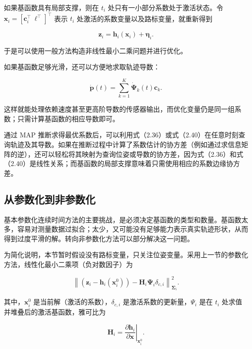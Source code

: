 如果基函数具有局部支撑，则在 $t_i$ 处只有一小部分系数处于激活状态。令 $\pmb x_i=[\pmb c_i^\top\ \pmb\ell^\top]^\top$ 表示 $t_i$ 处激活的系数变量以及路标变量，就重新得到

\begin{equation}
\boldsymbol {z} _ {i} = \boldsymbol {h} _ {i} (\boldsymbol {x} _ {i}) + \boldsymbol {\eta} _ {i}.\tag{2.39}
\end{equation}

于是可以使用一般方法构造非线性最小二乘问题并进行优化。

如果基函数足够光滑，还可以方便地求取轨迹导数：

\begin{equation}
\dot {\pmb {p}} (t) = \sum_ {k = 1} ^ {K} \dot {\pmb {\Psi}} _ {k} (t) \pmb {c} _ {k}.\tag{2.40}
\end{equation}

这样就能处理依赖速度甚至更高阶导数的传感器输出，而优化变量仍是同一组系数；只需计算基函数的相应导数即可。

通过 MAP 推断求得最优系数后，可以利用式（2.36）或式（2.40）在任意时刻查询轨迹及其导数。如果在推断过程中计算了系数估计的协方差（例如通过求信息矩阵的逆），还可以轻松将其映射为查询位姿或导数的协方差，因为式（2.36）和式（2.40）是线性关系；而基函数的局部支撑意味着只需使用相应的系数边缘协方差。

\subsection{从参数化到非参数化}

基本参数化连续时间方法的主要挑战，是必须决定基函数的类型和数量。基函数太多，容易对测量数据过拟合；太少，又可能没有足够能力表示真实轨迹形状，从而得到过度平滑的解。转向非参数化方法可以部分解决这一问题。

为简化说明，本节暂时假设没有路标变量，只关注位姿变量。采用上一节的参数化方法，线性化最小二乘项（负对数因子）为

\begin{equation}
\left\| \left(\boldsymbol {z} _ {i} - \boldsymbol {h} _ {i} \left(\boldsymbol {x} _ {i} ^ {0}\right)\right) - \boldsymbol {H} _ {i} \boldsymbol {\Psi} _ {i} \delta_ {c, i} \right\| _ {\boldsymbol {\Sigma} _ {i}} ^ {2}.\tag{2.41}
\end{equation}

其中，$\pmb x_i^0$ 是当前解（激活的系数），$\delta_{c,i}$ 是激活系数的更新量，$\Psi_i$ 是在 $t_i$ 处求值并堆叠后的激活基函数，雅可比为

\begin{equation}
\boldsymbol {H} _ {i} = \left. \frac {\partial \boldsymbol {h} _ {i}}{\partial \boldsymbol {x}} \right| _ {\boldsymbol {x} _ {i} ^ {0}}.\tag{2.42}
\end{equation}

